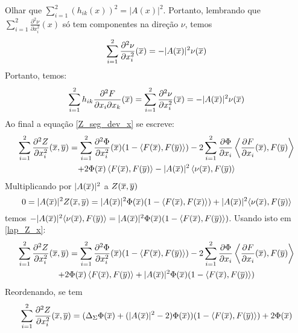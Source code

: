 \begin{demonstracao}
\begin{equation*}
	\end{equation*}	
	Olhar que $\sum_{i=1}^2 (h_{ik}(x))^2 = | A(x) |^2$. Portanto, lembrando que $\sum_{i=1}^2 \frac{\partial^2 \nu}{\partial x_i^2}(x)$ só tem componentes na direção $\nu$, temos
	\begin{equation*}
	\sum_{i=1}^2 \frac{\partial^2 \nu}{\partial x_i^2}(\overline{x}) = - | A(\overline{x}) |^2 \nu(\overline{x})
	\end{equation*}	
	Portanto, temos:
	\begin{equation*}
	\sum_{i=1}^2 h_{ik} \frac{\partial^2 F}{\partial x_i \partial x_k}(\overline{x}) = \sum_{i=1}^2 \frac{\partial^2 \nu}{\partial x_i^2}(\overline{x}) = - | A(\overline{x}) |^2 \nu(\overline{x})
	\end{equation*}	
	Ao final a equação \eqref{Z_seg_dev_x} se escreve:
	\begin{multline}\label{lap_Z_x}
	\sum_{i=1}^2 \frac{\partial^2 Z}{\partial x_i^2}(\overline{x},\overline{y}) =  \sum_{i=1}^2 \frac{\partial^2 \Phi}{\partial x_i^2}(\overline{x})(1 - \langle F(\overline{x}), F(\overline{y}) \rangle) -2  \sum_{i=1}^2 \frac{\partial \Phi}{\partial x_i} \left\langle \frac{\partial F}{\partial x_i}(\overline{x}), F(\overline{y}) \right\rangle\\
	+ 2  \Phi(\overline{x}) \left\langle F(\overline{x}), F(\overline{y}) \right\rangle - | A(\overline{x}) |^2 \left\langle \nu(\overline{x}), F(\overline{y}) \right\rangle
	\end{multline}	
	Multiplicando por $|A(\overline{x})|^2$ a $Z(\overline{x},\overline{y})$
	\begin{equation*}
	0 = |A(\overline{x})|^2 Z(\overline{x},\overline{y}) = |A(\overline{x})|^2 \Phi(\overline{x}) (1 - \langle F(\overline{x}), F(\overline{x}) \rangle) + |A(\overline{x})|^2 \langle \nu(\overline{x}), F(\overline{y}) \rangle
	\end{equation*}	
	temos $-|A(\overline{x})|^2 \langle \nu(\overline{x}), F(\overline{y}) \rangle = |A(\overline{x})|^2 \Phi(\overline{x}) (1 - \langle F(\overline{x}), F(\overline{y}) \rangle)$. Usando isto em \eqref{lap_Z_x}:
	\begin{multline*}
	\sum_{i=1}^2 \frac{\partial^2 Z}{\partial x_i^2}(\overline{x},\overline{y}) =  \sum_{i=1}^2 \frac{\partial^2 \Phi}{\partial x_i^2}(\overline{x})(1 - \langle F(\overline{x}), F(\overline{y}) \rangle) -2  \sum_{i=1}^2 \frac{\partial \Phi}{\partial x_i} \left\langle \frac{\partial F}{\partial x_i}(\overline{x}), F(\overline{y}) \right\rangle\\
	+ 2  \Phi(\overline{x}) \left\langle F(\overline{x}), F(\overline{y}) \right\rangle + |A(\overline{x})|^2 \Phi(\overline{x}) (1 - \langle F(\overline{x}), F(\overline{y}) \rangle)
	\end{multline*}	
	Reordenando, se tem
	\begin{multline*}
	\sum_{i=1}^2 \frac{\partial^2 Z}{\partial x_i^2}(\xb,\yb) = (\Delta_{\Sigma} \Phi(\xb) + (|A(\xb)|^2 - 2)\Phi(\xb))(1 - \langle F(\xb), F(\yb) \rangle) + 2 \Phi(\xb)\\

\end{multline*}
\end{demonstracao}
